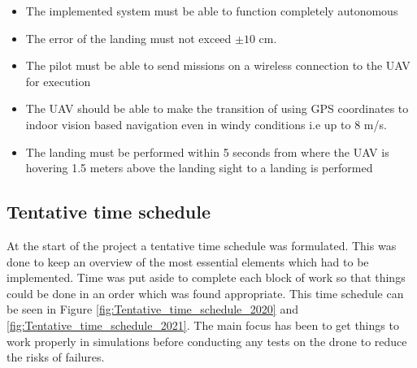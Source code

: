\documentclass[../Head/report.tex]{subfiles}
\begin{document}
\begin{itemize}
	\item The implemented system must be able to function completely autonomous
    \item The error of the landing must not exceed $\pm 10$ cm. 
    \item The pilot must be able to send missions on a wireless connection to the UAV for execution
    \item The UAV should be able to make the transition of using GPS coordinates to indoor vision based navigation even in windy conditions i.e up to 8 m/s.
    \item The landing must be performed within 5 seconds from where the UAV is hovering 1.5 meters above the landing sight to a landing is performed

\end{itemize}


\newpage
\subsection{Tentative time schedule}
\label{sec:tentative_time_schedule}

At the start of the project a tentative time schedule was formulated. This was done to keep an overview of the most essential elements which had to be implemented. Time was put aside to complete each block of work so that things could be done in an order which was found appropriate.  This time schedule can be seen in Figure \ref{fig:Tentative_time_schedule_2020} and \ref{fig:Tentative_time_schedule_2021}. The main focus has been to get things to work properly in simulations before conducting any tests on the drone to reduce the risks of failures.   

%
\newcommand{\myWeek}{\themyWeekNum
    \stepcounter{myWeekNum}
    \ifnum\themyWeekNum=53
         \setcounter{myWeekNum}{1}
    \else\fi
}
\end{document}
